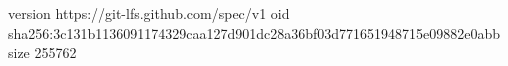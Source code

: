 version https://git-lfs.github.com/spec/v1
oid sha256:3c131b1136091174329caa127d901dc28a36bf03d771651948715e09882e0abb
size 255762
